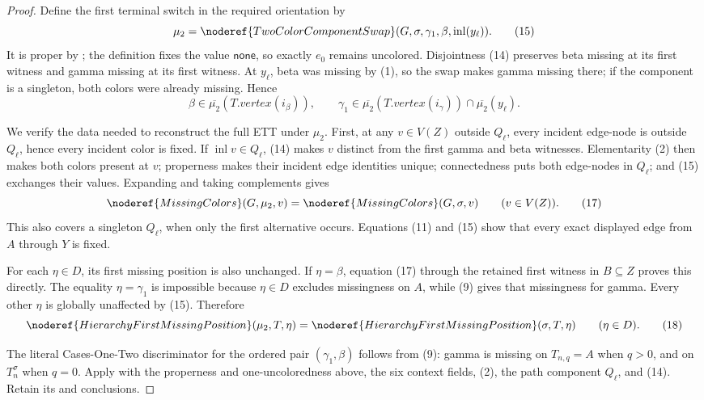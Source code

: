 \begin{proof}
Define the first terminal switch in the required orientation by
\[
 \mu_2=\noderef{TwoColorComponentSwap}
       (G,\sigma,\gamma_1,\beta,\operatorname{inl}(y_\ell)).   \tag{15}
\]
It is proper by ; the definition
fixes the value $\mathsf{none}$, so exactly $e_0$ remains uncolored.
Disjointness (14) preserves beta missing at its first witness and gamma
missing at its first witness.  At $y_\ell$, beta was missing by (1), so
the swap makes gamma missing there; if the component is a singleton,
both colors were already missing.  Hence
\[
 \beta\in\overline{\mu_2}(T.\mathit{vertex}(i_\beta)),\qquad
 \gamma_1\in\overline{\mu_2}(T.\mathit{vertex}(i_\gamma))
                  \cap\overline{\mu_2}(y_\ell).              \tag{16}
\]

We verify the data needed to reconstruct the full ETT under $\mu_2$.
First, at any $v\in V(Z)$ outside $Q_\ell$, every incident edge-node is
outside $Q_\ell$, hence every incident color is fixed.  If
$\operatorname{inl}v\in Q_\ell$, (14) makes $v$ distinct from the first
gamma and beta witnesses.  Elementarity (2) then makes both colors
present at $v$; properness makes their incident edge identities unique;
connectedness puts both edge-nodes in $Q_\ell$; and (15) exchanges their
values.  Expanding  and taking complements gives
\[
 \noderef{MissingColors}(G,\mu_2,v)
   =\noderef{MissingColors}(G,\sigma,v)\qquad(v\in V(Z)).      \tag{17}
\]
This also covers a singleton $Q_\ell$, when only the first alternative
occurs.  Equations (11) and (15) show that every exact displayed edge
from $A$ through $Y$ is fixed.

For each $\eta\in D$, its first missing position is also unchanged.
If $\eta=\beta$, equation (17) through the retained first witness in
$B\subseteq Z$ proves this directly.  The equality $\eta=\gamma_1$ is
impossible because $\eta\in D$ excludes missingness on $A$, while (9)
gives that missingness for gamma.  Every other $\eta$ is globally
unaffected by (15).  Therefore
\[
 \noderef{HierarchyFirstMissingPosition}(\mu_2,T,\eta)
 =\noderef{HierarchyFirstMissingPosition}(\sigma,T,\eta)
                         \qquad(\eta\in D).                   \tag{18}
\]

The literal Cases-One-Two discriminator for the ordered pair
$(\gamma_1,\beta)$ follows from (9): gamma is missing on $T_{n,q}=A$
when $q>0$, and on $T_n^\sigma$ when $q=0$.  Apply
 with the properness and
one-uncoloredness above, the six context fields, (2), the path component
$Q_\ell$, and (14).  Retain its
 and  conclusions.


\end{proof}
